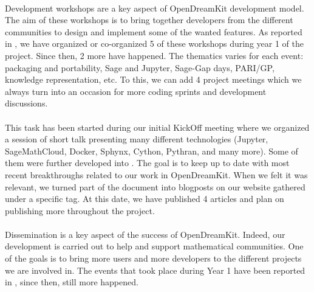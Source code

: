 \documentclass{deliverablereport}
\begin{document}
\paragraph{}

Development workshops are a key aspect of OpenDreamKit development model. The aim of these workshops is to bring together developers from the different communities to design and implement some 
of the wanted features. As reported in , we have organized
or co-organized 5 of these workshops during year 1 of the project. Since then, 2 more have happened. The thematics varies
for each event: packaging and portability, Sage and Jupyter, Sage-Gap days, PARI/GP, knowledge representation, etc. To this,
we can add 4 project meetings which we always turn into an occasion for more coding sprints and development
discussions.

\paragraph{}

This task has been started during our initial KickOff meeting where we organized a session of short
talk presenting many different technologies (Jupyter, SageMathCloud, Docker, Sphynx, Cython, Pythran, and
many more). Some of them were further developed into . The goal is to
keep up to date with most recent breakthroughs related to our work in OpenDreamKit. When we felt
it was relevant, we turned part of the document into blogposts on our website gathered under a 
specific tag. At this date, we have published 4 articles and plan on publishing more throughout the
project.

\paragraph{}

Dissemination is a key aspect of the success of OpenDreamKit. Indeed, our development is carried
out to help and support mathematical communities. One of the goals is to bring
more users and more developers to the different projects we are involved in. The events
that took place during Year 1 have been reported in , since then, still
more happened.
\end{document}
